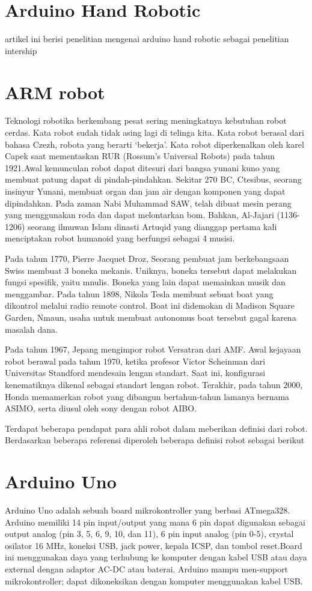 \section{Arduino Hand Robotic}

artikel ini berisi penelitian mengenai arduino hand robotic sebagai penelitian intership

\section{ARM robot} 
Teknologi robotika berkembang pesat sering meningkatnya kebutuhan robot cerdas. Kata robot sudah tidak asing lagi di telinga kita. Kata robot berasal dari bahasa Czezh, robota yang berarti ‘bekerja’. Kata robot diperkenalkan oleh karel Capek saat mementaskan RUR (Rossum’s Universal Robots) pada tahun 1921.Awal kemunculan robot dapat ditesuri dari bangsa yunani kuno yang membuat patung dapat di pindah-pindahkan. Sekitar 270 BC, Ctesibus, seorang insinyur Yunani, membuat organ dan jam air dengan komponen yang dapat dipindahkan. Pada zaman Nabi Muhammad SAW, telah dibuat mesin perang yang menggunakan roda dan dapat melontarkan bom. Bahkan, Al-Jajari (1136-1206) seorang ilmuwan Islam dinasti Artuqid yang dianggap pertama kali menciptakan robot humanoid yang berfungsi sebagai 4 musisi.

Pada tahun 1770, Pierre Jacquet Droz, Seorang pembuat jam berkebangsaan Swiss membuat 3 boneka mekanis. Uniknya, boneka tersebut dapat melakukan fungsi spesifik, yaitu mnulis. Boneka yang lain dapat memainkan musik dan menggambar. Pada tahun 1898, Nikola Tesla membuat sebuat boat yang dikontrol melalui radio remote control. Boat ini didemokan di Madison Square Garden, Nmaun, usaha untuk membuat autonomus boat tersebut gagal karena masalah dana.

Pada tahun 1967, Jepang mengimpor robot Versatran dari AMF. Awal kejayaan robot berawal pada tahun 1970, ketika profesor Victor Scheinman dari Universitas Standford mendesain lengan standart. Saat ini, konfigurasi kenematiknya dikenal sebagai standart lengan robot. Terakhir, pada tahun 2000, Honda memamerkan robot yang dibangun bertahun-tahun lamanya bernama ASIMO, serta diusul oleh sony dengan robot AIBO.

Terdapat beberapa pendapat para ahli robot dalam meberikan definisi    dari robot. Berdasarkan beberapa referensi diperoleh beberapa definisi robot sebagai berikut

\section{Arduino Uno}
Arduino Uno adalah sebuah board mikrokontroller yang berbasi ATmega328.  Arduino  memiliki  14 pin input/output yang mana 6 pin dapat digunakan sebagai output analog (pin 3, 5, 6, 9, 10, dan 11), 6 pin input analog (pin 0-5), crystal osilator 16 MHz, koneksi USB, jack power, kepala ICSP, dan tombol reset.Board ini menggunakan daya yang terhubung ke komputer dengan kabel USB atau daya external dengan adaptor AC-DC atau baterai. Arduino mampu men-support mikrokontroller; dapat dikoneksikan dengan  komputer  menggunakan kabel USB.

